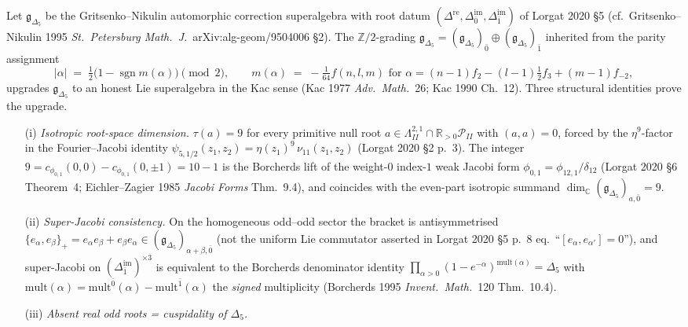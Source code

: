 \begin{proposition}
\label{prop:qgfnd-gd5-super-grading}
Let $\mathfrak g_{\Delta_5}$ be the Gritsenko--Nikulin automorphic
correction superalgebra with root datum
$(\Delta^{\mathrm{re}}, \Delta^{\mathrm{im}}_{\bar 0},
\Delta^{\mathrm{im}}_{\bar 1})$ of Lorgat 2020 §5
(cf.\ Gritsenko--Nikulin 1995 \emph{St.~Petersburg Math.~J.}~arXiv:alg-geom/9504006 §2).
The $\mathbb Z/2$-grading
$\mathfrak g_{\Delta_5}=(\mathfrak g_{\Delta_5})_{\bar 0}\oplus
(\mathfrak g_{\Delta_5})_{\bar 1}$ inherited from the parity assignment
\[
 |\alpha|\;=\;\tfrac{1}{2}\bigl(1-\operatorname{sgn} m(\alpha)\bigr)\pmod 2,
 \qquad
 m(\alpha)\;=\;-\tfrac{1}{64} f(n,l,m)
 \text{ for }\alpha=(n-1)f_2-(l-1)\tfrac{1}{2} f_3+(m-1) f_{-2},
\]
upgrades $\mathfrak g_{\Delta_5}$ to an honest Lie superalgebra in the
Kac sense (Kac 1977 \emph{Adv.~Math.}~26; Kac 1990 Ch.~12).
Three structural identities prove the upgrade.
\begin{enumerate}
 \item[\textup{(i)}] \emph{Isotropic root-space dimension.}
 $\tau(a)=9$ for every primitive null root
 $a\in\Lambda^{2,1}_{II}\cap\mathbb R_{>0}\mathcal P_{II}$ with
 $(a,a)=0$, forced by the $\eta^9$-factor in the Fourier--Jacobi
 identity
 $\psi_{5,1/2}(z_1,z_2)=\eta(z_1)^9\,\nu_{11}(z_1,z_2)$
 (Lorgat 2020 §2 p.~3). The integer
 $9 = c_{\phi_{0,1}}(0,0)-c_{\phi_{0,1}}(0,\pm 1)=10-1$ is the Borcherds
 lift of the weight-$0$ index-$1$ weak Jacobi form
 $\phi_{0,1}=\phi_{12,1}/\delta_{12}$ (Lorgat 2020 §6 Theorem~4;
 Eichler--Zagier 1985 \emph{Jacobi Forms} Thm.~9.4), and coincides
 with the even-part isotropic summand
 $\dim_{\mathbb C}(\mathfrak g_{\Delta_5})_{a,\bar 0}=9$.
 \item[\textup{(ii)}] \emph{Super-Jacobi consistency.}
 On the homogeneous odd--odd sector the bracket is antisymmetrised
 $\{e_\alpha,e_\beta\}_+=e_\alpha e_\beta+e_\beta e_\alpha\in
 (\mathfrak g_{\Delta_5})_{\alpha+\beta,\bar 0}$ (not the uniform Lie
 commutator asserted in Lorgat 2020 §5 p.~8 eq.\ ``$[e_\alpha,e_{\alpha'}]=0$''),
 and super-Jacobi on
 $(\Delta^{\mathrm{im}}_{\bar 1})^{\times 3}$ is equivalent to the
 Borcherds denominator identity
 $\prod_{\alpha>0}(1-e^{-\alpha})^{\mathrm{mult}(\alpha)}=\Delta_5$
 with $\mathrm{mult}(\alpha)=\mathrm{mult}^{\bar 0}(\alpha)-
 \mathrm{mult}^{\bar 1}(\alpha)$ the \emph{signed} multiplicity
 (Borcherds 1995 \emph{Invent.~Math.}~120 Thm.~10.4).
 \item[\textup{(iii)}] \emph{Absent real odd roots = cuspidality of $\Delta_5$.}

\end{enumerate}
\end{proposition}
